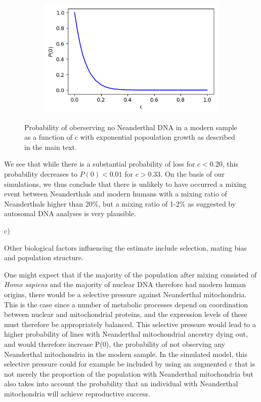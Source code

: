 \documentclass{article}
\begin{document}
\begin{figure}[h]
	\centering
	\begin{subfigure}[t]{0.45\linewidth}
		\centering
		\includegraphics[width = 1.0\linewidth, trim={0 0 0 0}, clip=true]{figures/ccurve_exp.png}
	\end{subfigure}
\caption{Probability of oberserving no Neanderthal DNA in a modern sample as a function of c with exponential popoulation growth as described in the main text.}
\label{fig:exp_ccurve}
\end{figure}

We see that while there is a substantial probability of loss for $c < 0.20$, this probability decreases to  $P(0) < 0.01$ for $c > 0.33$. On the basis of our simulations, we thus conclude that there is unlikely to have occurred a mixing event between Neanderthals and modern humans with a mixing ratio of Neanderthals higher than 20\%, but a mixing ratio of 1-2\% as suggested by autosomal DNA analyses is very plausible.

c) %

Other biological factors influencing the estimate include selection, mating bias and population structure.

One might expect that if the majority of the population after mixing consisted of \textit{Homo sapiens} and the majority of nuclear DNA therefore had modern human origins, there would be a selective pressure against Neanderthal mitochondria. This is the case since a number of metabolic processes depend on coordination between nuclear and mitochondrial proteins, and the expression levels of these must therefore be appropriately balanced. This selective pressure would lead to a higher probability of lines with Neanderthal mitochondrial ancestry dying out, and would therefore increase P(0), the probability of not observing any Neanderthal mitochondria in the modern sample. In the simulated model, this selective pressure could for example be included by using an augmented c that is not merely the proportion of the population with Neanderthal mitochondria but also takes into account the probability that an individual with Neanderthal mitochondria will achieve reproductive success.
\end{document}
